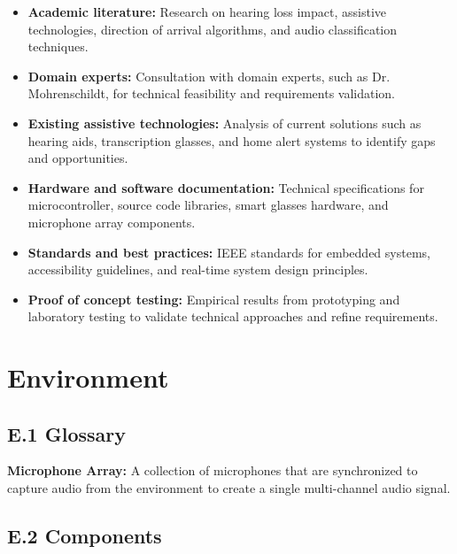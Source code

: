 \documentclass[12pt]{article}
\theoremstyle{definition}
\begin{document}
\begin{itemize}
\item \textbf{Academic literature:} Research on hearing loss impact,
assistive technologies, direction of arrival algorithms, and audio
classification techniques.

\item \textbf{Domain experts:}\label{itm:domain-experts} Consultation with domain experts, such as 
Dr. Mohrenschildt, for technical feasibility and requirements validation.

\item \textbf{Existing assistive technologies:} Analysis of current solutions
such as hearing aids, transcription glasses, and home alert systems to
identify gaps and opportunities.

\item \textbf{Hardware and software documentation:} Technical specifications
for microcontroller, source code libraries, smart glasses hardware,
and microphone array components.

\item \textbf{Standards and best practices:} IEEE standards for embedded
systems, accessibility guidelines, and real-time system design principles.

\item \textbf{Proof of concept testing:} Empirical results from prototyping
and laboratory testing to validate technical approaches and refine
requirements.
\end{itemize}


\section{Environment}

\subsection{E.1 Glossary}

\textbf{Microphone Array:}\label{def:microphone_array} A collection of 
microphones that are synchronized to capture audio from the 
environment to create a single multi-channel audio signal.

\subsection{E.2 Components}
\end{document}
